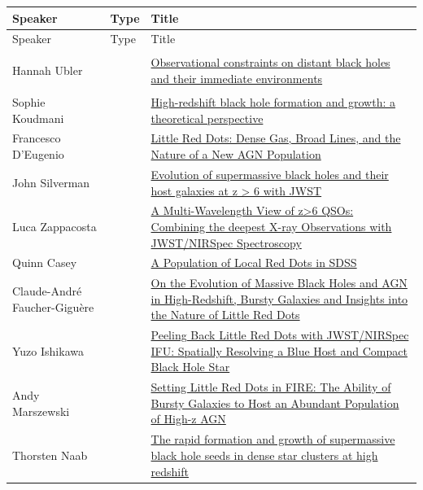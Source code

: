 {
\small
{}
\sloppy
\setlength{\emergencystretch}{1em}
\begin{longtable}{@{}>{\TableRaggedRight\arraybackslash\hspace{0pt}}p{} >{\centering\arraybackslash}p{} >{\TableRaggedRight\arraybackslash\hspace{0pt}}p{}@{}}
\toprule
Speaker & Type & Title \\
\midrule
\endfirsthead
\toprule
Speaker & Type & Title \\
\midrule
\endhead
\hypertarget{sched-5}{}Hannah Ubler & \invitedbadge{} & \hyperlink{abs-5}{Observational constraints on distant black holes and their immediate environments} \\
\hypertarget{sched-6}{}Sophie Koudmani & \invitedbadge{} & \hyperlink{abs-6}{High-redshift black hole formation and growth: a theoretical perspective} \\
\hypertarget{sched-10}{}Francesco D'Eugenio & \invitedbadge{} & \hyperlink{abs-10}{Little Red Dots: Dense Gas, Broad Lines, and the Nature of a New AGN Population} \\
\hypertarget{sched-54}{}John Silverman &  & \hyperlink{abs-54}{Evolution of supermassive black holes and their host galaxies at z > 6 with JWST} \\
\hypertarget{sched-55}{}Luca Zappacosta &  & \hyperlink{abs-55}{A Multi-Wavelength View of z>6 QSOs: Combining the deepest X-ray Observations with JWST/NIRSpec Spectroscopy} \\
\hypertarget{sched-56}{}Quinn Casey &  & \hyperlink{abs-56}{A Population of Local Red Dots in SDSS} \\
\hypertarget{sched-57}{}Claude-André Faucher-Giguère &  & \hyperlink{abs-57}{On the Evolution of Massive Black Holes and AGN in High-Redshift, Bursty Galaxies and Insights into the Nature of Little Red Dots} \\
\hypertarget{sched-58}{}Yuzo Ishikawa &  & \hyperlink{abs-58}{Peeling Back Little Red Dots with JWST/NIRSpec IFU: Spatially Resolving a Blue Host and Compact Black Hole Star} \\
\hypertarget{sched-60}{}Andy Marszewski &  & \hyperlink{abs-60}{Setting Little Red Dots in FIRE: The Ability of Bursty Galaxies to Host an Abundant Population of High-z AGN} \\
\hypertarget{sched-61}{}Thorsten Naab &  & \hyperlink{abs-61}{The rapid formation and growth of supermassive black hole seeds in dense star clusters at high redshift} \\

\end{longtable}}

